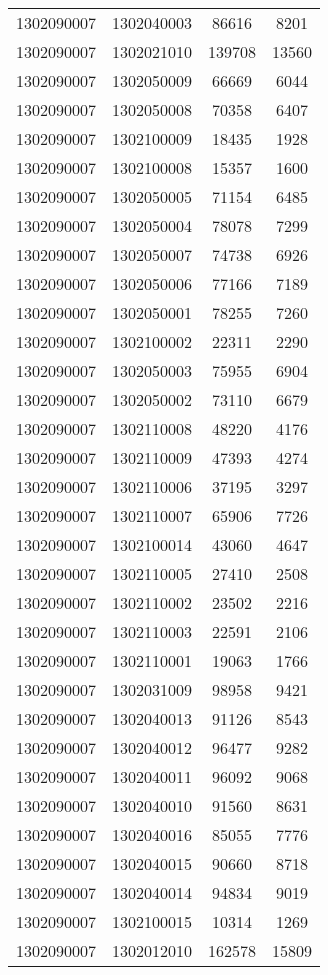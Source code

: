 \begin{longtable}{llcc}
1302090007 & 1302040003 & 86616 & 8201\\
1302090007 & 1302021010 & 139708 & 13560\\
1302090007 & 1302050009 & 66669 & 6044\\
1302090007 & 1302050008 & 70358 & 6407\\
1302090007 & 1302100009 & 18435 & 1928\\
1302090007 & 1302100008 & 15357 & 1600\\
1302090007 & 1302050005 & 71154 & 6485\\
1302090007 & 1302050004 & 78078 & 7299\\
1302090007 & 1302050007 & 74738 & 6926\\
1302090007 & 1302050006 & 77166 & 7189\\
1302090007 & 1302050001 & 78255 & 7260\\
1302090007 & 1302100002 & 22311 & 2290\\
1302090007 & 1302050003 & 75955 & 6904\\
1302090007 & 1302050002 & 73110 & 6679\\
1302090007 & 1302110008 & 48220 & 4176\\
1302090007 & 1302110009 & 47393 & 4274\\
1302090007 & 1302110006 & 37195 & 3297\\
1302090007 & 1302110007 & 65906 & 7726\\
1302090007 & 1302100014 & 43060 & 4647\\
1302090007 & 1302110005 & 27410 & 2508\\
1302090007 & 1302110002 & 23502 & 2216\\
1302090007 & 1302110003 & 22591 & 2106\\
1302090007 & 1302110001 & 19063 & 1766\\
1302090007 & 1302031009 & 98958 & 9421\\
1302090007 & 1302040013 & 91126 & 8543\\
1302090007 & 1302040012 & 96477 & 9282\\
1302090007 & 1302040011 & 96092 & 9068\\
1302090007 & 1302040010 & 91560 & 8631\\
1302090007 & 1302040016 & 85055 & 7776\\
1302090007 & 1302040015 & 90660 & 8718\\
1302090007 & 1302040014 & 94834 & 9019\\
1302090007 & 1302100015 & 10314 & 1269\\
1302090007 & 1302012010 & 162578 & 15809\\

\end{longtable}
